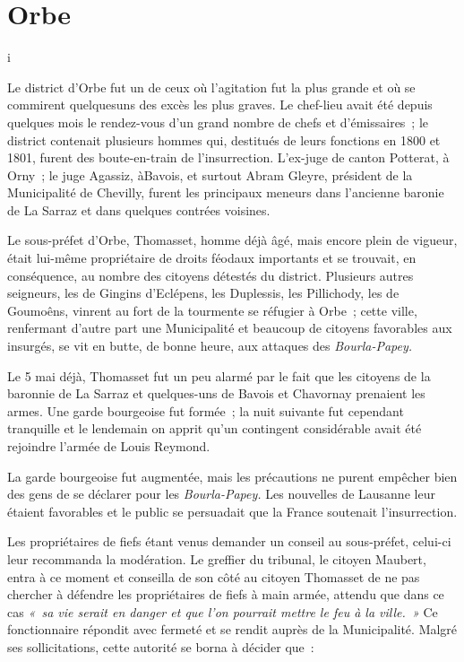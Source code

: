 \documentclass[french,twoside]{book} %
\begin{document}
\section[Orbe]{Orbe}
\noindent i\par
Le district d’Orbe fut un de ceux où l’agitation fut la plus grande et où se commirent quelquesuns des excès les plus graves. Le chef-lieu avait été depuis quelques mois le rendez-vous d’un grand nombre de chefs et d’émissaires ; le district contenait plusieurs hommes qui, destitués de leurs fonctions en 1800 et 1801, furent des boute-en-train de l’insurrection. L’ex-juge de canton Potterat, à Orny ; le juge Agassiz, àBavois, et surtout Abram Gleyre, président de la Municipalité de Chevilly, furent les principaux meneurs dans l’ancienne baronie de La Sarraz et dans quelques contrées voisines.\par
Le sous-préfet d’Orbe, Thomasset, homme déjà âgé, mais encore plein de vigueur, était lui-même propriétaire de droits féodaux importants et se trouvait, en conséquence, au nombre des citoyens détestés du district. Plusieurs autres seigneurs, les de Gingins d’Eclépens, les Duplessis, les Pillichody, les de Goumoêns, vinrent au fort de la tourmente se réfugier à Orbe ; cette ville, renfermant d’autre part une Municipalité et beaucoup de citoyens favorables aux insurgés, se vit en butte, de bonne heure, aux attaques des \emph{Bourla-Papey.}\par
Le 5 mai déjà, Thomasset fut un peu alarmé par le fait que les citoyens de la baronnie de La Sarraz et quelques-uns de Bavois et Chavornay prenaient les armes. Une garde bourgeoise fut formée ; la nuit suivante fut cependant tranquille et le lendemain on apprit qu’un contingent considérable avait été rejoindre l’armée de Louis Reymond.\par
La garde bourgeoise fut augmentée, mais les précautions ne purent empêcher bien des gens de se déclarer pour les \emph{Bourla-Papey.} Les nouvelles de Lausanne leur étaient favorables et le public se persuadait que la France soutenait l’insurrection.\par
Les propriétaires de fiefs étant venus demander un conseil au sous-préfet, celui-ci leur recommanda la modération. Le greffier du tribunal, le citoyen Maubert, entra à ce moment et conseilla de son côté au citoyen Thomasset de ne pas chercher à défendre les propriétaires de fiefs à main armée, attendu que dans ce cas \emph{« sa vie serait en danger et que l’on pourrait mettre le feu à la ville. »} Ce fonctionnaire répondit avec fermeté et se rendit auprès de la Municipalité. Malgré ses sollicitations, cette autorité se borna à décider que :\par
\end{document}
